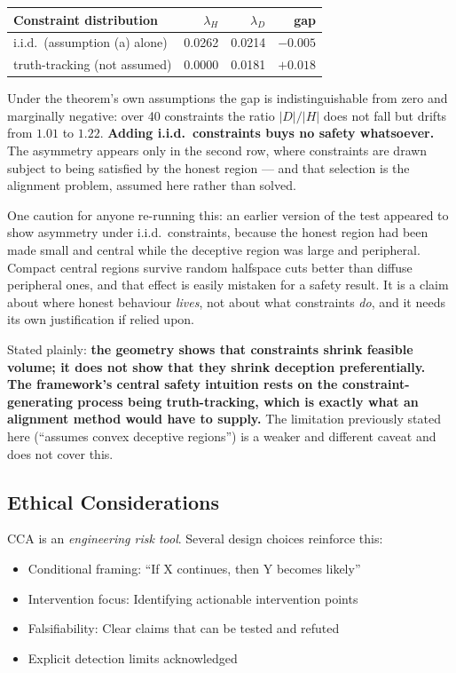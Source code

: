\documentclass[11pt,a4paper]{article}
\theoremstyle{definition}
\theoremstyle{remark}
\begin{document}
\begin{center}
\begin{tabular}{lrrr}
\toprule
Constraint distribution & $\lambda_H$ & $\lambda_D$ & gap \\
\midrule
i.i.d.\ (assumption (a) alone) & 0.0262 & 0.0214 & $-0.005$ \\
truth-tracking (not assumed) & 0.0000 & 0.0181 & $+0.018$ \\
\bottomrule
\end{tabular}
\end{center}

Under the theorem's own assumptions the gap is indistinguishable from zero and marginally
negative: over 40 constraints the ratio $|D|/|H|$ does not fall but drifts from $1.01$ to
$1.22$. \textbf{Adding i.i.d.\ constraints buys no safety whatsoever.} The asymmetry appears
only in the second row, where constraints are drawn subject to being satisfied by the honest
region --- and that selection is the alignment problem, assumed here rather than solved.

One caution for anyone re-running this: an earlier version of the test appeared to show
asymmetry under i.i.d.\ constraints, because the honest region had been made small and central
while the deceptive region was large and peripheral. Compact central regions survive random
halfspace cuts better than diffuse peripheral ones, and that effect is easily mistaken for a
safety result. It is a claim about where honest behaviour \emph{lives}, not about what
constraints \emph{do}, and it needs its own justification if relied upon.

Stated plainly: \textbf{the geometry shows that constraints shrink feasible volume; it does not
show that they shrink deception preferentially. The framework's central safety intuition rests
on the constraint-generating process being truth-tracking, which is exactly what an alignment
method would have to supply.} The limitation previously stated here (``assumes convex deceptive
regions'') is a weaker and different caveat and does not cover this.

\subsection{Ethical Considerations}

CCA is an \textit{engineering risk tool}. Several design choices reinforce this:

\begin{itemize}
    \item Conditional framing: ``If X continues, then Y becomes likely''
    \item Intervention focus: Identifying actionable intervention points
    \item Falsifiability: Clear claims that can be tested and refuted
    \item Explicit detection limits acknowledged
\end{itemize}
\end{document}
